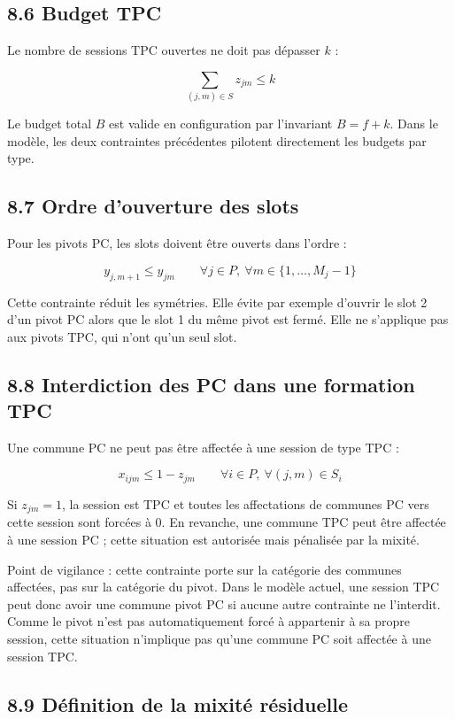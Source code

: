 \documentclass[11pt,a4paper]{article}
\begin{document}
\subsection{8.6 Budget TPC}

Le nombre de sessions TPC ouvertes ne doit pas dépasser $k$ :

\[
\sum_{(j,m)\in S} z_{jm} \leq k
\]

Le budget total $B$ est valide en configuration par l'invariant $B = f + k$. Dans le modèle, les deux contraintes précédentes pilotent directement les budgets par type.

\subsection{8.7 Ordre d'ouverture des slots}

Pour les pivots PC, les slots doivent être ouverts dans l'ordre :

\[
y_{j,m+1} \leq y_{jm}
\qquad
\forall j \in P,\ \forall m \in \{1,\dots,M_j-1\}
\]

Cette contrainte réduit les symétries. Elle évite par exemple d'ouvrir le slot 2 d'un pivot PC alors que le slot 1 du même pivot est fermé. Elle ne s'applique pas aux pivots TPC, qui n'ont qu'un seul slot.

\subsection{8.8 Interdiction des PC dans une formation TPC}

Une commune PC ne peut pas être affectée à une session de type TPC :

\[
x_{ijm} \leq 1-z_{jm}
\qquad
\forall i \in P,\ \forall (j,m)\in S_i
\]

Si $z_{jm} = 1$, la session est TPC et toutes les affectations de communes PC vers cette session sont forcées à $0$. En revanche, une commune TPC peut être affectée à une session PC ; cette situation est autorisée mais pénalisée par la mixité.

Point de vigilance : cette contrainte porte sur la catégorie des communes affectées, pas sur la catégorie du pivot. Dans le modèle actuel, une session TPC peut donc avoir une commune pivot PC si aucune autre contrainte ne l'interdit. Comme le pivot n'est pas automatiquement forcé à appartenir à sa propre session, cette situation n'implique pas qu'une commune PC soit affectée à une session TPC.

\subsection{8.9 Définition de la mixité résiduelle}
\end{document}
